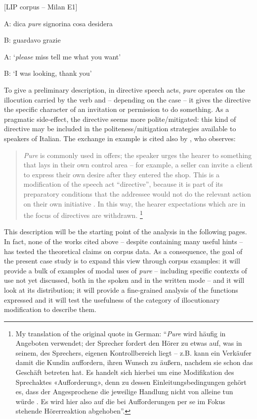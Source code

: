 \ea%
    \label{ex:key:23}

          [LIP corpus – Milan E1]

A:   dica \textit{pure} signorina cosa desidera

  B:   guardavo grazie

\glt  
A:  ‘\textit{please} miss tell me what you want’

  B:   ‘I was looking, thank you’
    \z

To give a preliminary description, in directive speech acts, \textit{pure} operates on the illocution carried by the verb and – depending on the case – it gives the directive the specific character of an invitation or permission to do something. As a pragmatic side-effect, the directive seems more polite/mitigated: this kind of directive may be included in the politeness/mitigation strategies available to speakers of Italian. The exchange in example  is cited also by \citet{Waltereit2006}, who observes:

\begin{quote}
\textit{Pure} is commonly used in offers; the speaker urges the hearer to something that lays in their own control area – for example, a seller can invite a client to express their own desire after they entered the shop. This is a modification of the speech act “directive”, because it is part of its preparatory conditions that the addressee would not do the relevant action on their own initiative \citep[66]{Searle1969}. In this way, the hearer expectations which are in the focus of directives are withdrawn. \citep[107]{Waltereit2006}\footnote{My translation of the original quote in German: “\textit{Pure} wird häufig in Angeboten verwendet; der Sprecher fordert den Hörer zu etwas auf, was in seinem, des Sprechers, eigenen Kontrollbereich liegt – z.B. kann ein Verkäufer damit die Kundin auffordern, ihren Wunsch zu äußern, nachdem sie schon das Geschäft betreten hat. Es handelt sich hierbei um eine Modifikation des Sprechaktes «Aufforderung», denn zu dessen Einleitungsbedingungen gehört es, dass der Angesprochene die jeweilige Handlung nicht von alleine tun würde \citep[66]{Searle1969}. Es wird hier also auf die bei Aufforderungen per se im Fokus stehende Hörerreaktion abgehoben”.}
\end{quote}

This description will be the starting point of the analysis in the following pages. In fact, none of the works cited above – despite containing many useful hints – has tested the theoretical claims on corpus data. As a consequence, the goal of the present case study is to expand this view through corpus examples: it will provide a bulk of examples of modal uses of \textit{pure} – including specific contexts of use not yet discussed, both in the spoken and in the written mode – and it will look at its distribution; it will provide a fine-grained analysis of the functions expressed and it will test the usefulness of the category of illocutionary modification to describe them.

